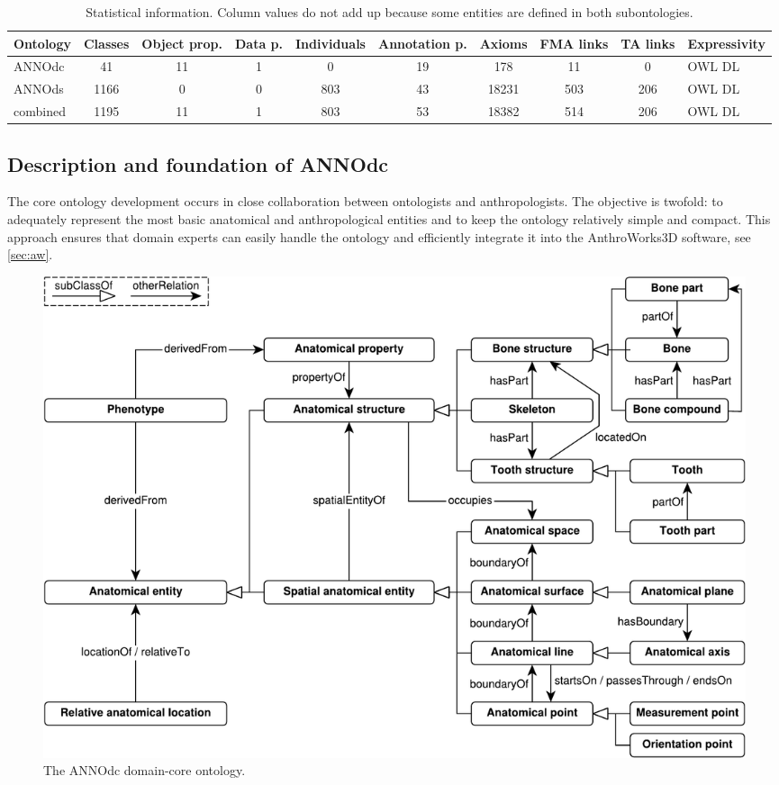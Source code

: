 \documentclass[sw]{iosart2x}
\newcommand{\aw}{AnthroWorks3D}
\begin{document}
\begin{table}[b]
\centering
\caption{Statistical information. Column values do not add up because some entities are defined in both subontologies.}
\label{tab:stats}
\begin{tabular}{lS[table-format=4.0]SSS[table-format=3.0]SS[table-format=5.0]S[table-format=3.0]S[table-format=3.0]l}
\toprule
Ontology	&\textnormal{Classes}	&\textnormal{Object prop.}	&\textnormal{Data p.}	&\textnormal{Individuals}	&\textnormal{Annotation p.}	&\textnormal{Axioms}	&\textnormal{FMA links}				&\textnormal{TA links} &Expressivity\\
\midrule
ANNOdc		&41						&11								&1								&0							&19				&178					&11							&0					&OWL DL\\
ANNOds		&1166					&0								&0								&803						&43				&18231					&503						&206				&OWL DL\\
\midrule
combined	&1195					&11								&1								&803						&53				&18382					&514						&206				&OWL DL\\
\bottomrule
\end{tabular}
\end{table}

\subsection{Description and foundation of ANNOdc}\label{sec:annodc}
The core ontology development occurs in close collaboration between ontologists and anthropologists.
The objective is twofold: to adequately represent the most basic anatomical and anthropological entities and to keep the ontology relatively simple and compact.
This approach ensures that domain experts can easily handle the ontology and efficiently integrate it into the \aw{} software, see \cref{sec:aw}.

\begin{figure}[h]
\includegraphics[width=\textwidth]{img/core.pdf}
\caption{The ANNOdc domain-core ontology.}\label{fig:annodc}
\end{figure}
\end{document}
